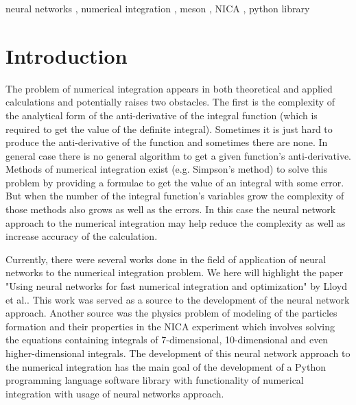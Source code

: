 \documentclass[%
]{ittmm}
\begin{document}
\begin{keywords}
  neural networks \sep
  numerical integration \sep
  meson \sep
  NICA \sep
  python library
\end{keywords}

\maketitle

\section{Introduction}

The problem of numerical integration appears in both theoretical and applied calculations and potentially raises two obstacles. The first is the complexity of the analytical form of the anti-derivative of the integral function (which is required to get the value of the definite integral). Sometimes it is just hard to produce the anti-derivative of the function and sometimes there are none. In general case there is no general algorithm to get a given function's anti-derivative. Methods of numerical integration exist (e.g. Simpson's method) to solve this problem by providing a formulae to get the value of an integral with some error. But when the number of the integral function's variables grow the complexity of those methods also grows as well as the errors. In this case the neural network approach to the numerical integration may help reduce the complexity as well as increase accuracy of the calculation.

Currently, there were several works done in the field of application of neural networks to the numerical integration problem. We here will highlight the paper "Using neural networks for fast numerical integration and optimization" by Lloyd et al.\cite{lloyd2020using}. This work was served as a source to the development of the neural network approach. Another source was the physics problem of modeling of the particles formation and their properties in the NICA experiment which involves solving the equations containing integrals of 7-dimensional, 10-dimensional and even higher-dimensional integrals. The development of this neural network approach to the numerical integration has the main goal of the development of a Python programming language software library with functionality of numerical integration with usage of neural networks approach.
\end{document}

